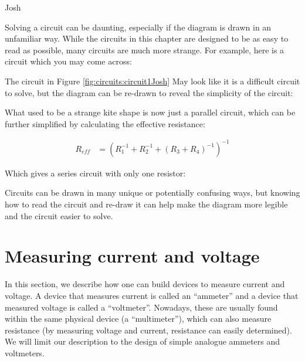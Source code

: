 \begin{studentOpinion}{Josh}{}
	
	Solving a circuit can be daunting, especially if the diagram is drawn in an unfamiliar  way. While the circuits in this chapter are designed to be as easy to read as possible, many circuits are much more strange. For example, here is a circuit which you may come across:
	

	
	The circuit in Figure \ref{fig:circuits:circuit1Josh} May look like it is a difficult circuit to solve, but the diagram can be re-drawn to reveal the simplicity of the circuit:
	
	
	What used to be a strange kite shape is now just a parallel circuit, which can be further simplified by calculating the effective resistance:
	
	\begin{align*}
	R_{eff} &= (R_1^{-1}+R_2^{-1}+(R_3+R_4)^{-1})^{-1}
	\end{align*}
	
	Which gives a series circuit with only one resistor:
	
	
	Circuits can be drawn in many unique or potentially confusing ways, but knowing how to read the circuit and re-draw it can help make the diagram more legible and the circuit easier to solve.
	
\end{studentOpinion}


\section{Measuring current and voltage}
In this section, we describe how one can build devices to measure current and voltage. A device that measures current is called an ``ammeter'' and a device that measured voltage is called a ``voltmeter''. Nowadays, these are usually found within the same physical device (a ``multimeter''), which can also measure resistance (by measuring voltage and current, resistance can easily determined). We will limit our description to the design of simple analogue ammeters and voltmeters. 

